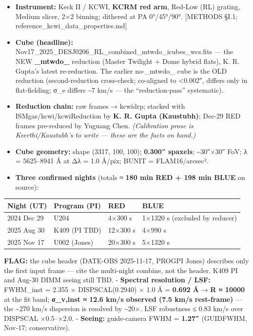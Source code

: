 \documentclass[
]{article}
\providecommand{\tightlist}{%
  \setlength{\itemsep}{0pt}\setlength{\parskip}{0pt}}
\newcommand{\BreakablePath}[1]{{\ttfamily\sloppy #1}}
\begin{document}
\begin{itemize}
\tightlist
\item
  \textbf{Instrument:} Keck II / KCWI, \textbf{KCRM red arm}, Red-Low
  (RL) grating, Medium slicer, 2×2 binning; dithered at PA 0°/45°/90°.
  {[}METHODS §I.1; reference\_kcwi\_data\_properties.md{]}
\item
  \textbf{Cube (headline):}
  \BreakablePath{Nov17\_\discretionary{}{}{}2025\_\discretionary{}{}{}DESJ0206\_\discretionary{}{}{}RL\_\discretionary{}{}{}combined\_\discretionary{}{}{}mtwdo\_\discretionary{}{}{}icubes\_\discretionary{}{}{}wcs.\discretionary{}{}{}fits}
  --- the NEW
  \textbf{\BreakablePath{\_\discretionary{}{}{}mtwdo\_\discretionary{}{}{}}}
  reduction (Master Twilight + Dome hybrid flats), K. R. Gupta's latest
  re-reduction. The earlier
  no-\BreakablePath{\_\discretionary{}{}{}mtwdo\_\discretionary{}{}{}}
  cube is the OLD reduction (second-reduction cross-check; co-aligned to
  \textless0.002″, differs only in flat-fielding; σ\_e differs
  \textasciitilde7 km/s --- the ``reduction-pass'' systematic).
\item
  \textbf{Reduction chain:} raw frames → \BreakablePath{kcwidrp};
  stacked with
  \BreakablePath{ISMgas/\discretionary{}{}{}kcwi/\discretionary{}{}{}kcwiReduction}
  by \textbf{K. R. Gupta (Kaustubh)}; Dec-29 RED frames pre-reduced by
  Yuguang Chen. \emph{(Calibration prose is Keerthi/Kaustubh's to write
  --- these are the facts on hand.)}
\item
  \textbf{Cube geometry:} shape (3317, 100, 100); \textbf{0.300″
  spaxels}; \textasciitilde30″×30″ FoV; λ = 5625--8941 Å at Δλ = 1.0
  Å/pix; BUNIT = FLAM16/arcsec².
\item
  \textbf{Three confirmed nights} (totals ≈ \textbf{180 min RED + 198
  min BLUE} on source):
\end{itemize}

\begin{longtable}[]{@{}llll@{}}
\toprule
Night (UT) & Program (PI) & RED & BLUE \\
\midrule
\endhead
2024 Dec 29 & U204 & 4×300 s & 1×1320 s (excluded by reducer) \\
2025 Aug 30 & K409 (PI TBD) & 12×300 s & 4×990 s \\
2025 Nov 17 & U002 (Jones) & 20×300 s & 5×1320 s \\
\bottomrule
\end{longtable}

\textbf{FLAG:} the cube header (DATE-OBS 2025-11-17, PROGPI Jones)
describes only the first input frame --- cite the multi-night combine,
not the header. K409 PI and Aug-30 DIMM seeing still TBD. -
\textbf{Spectral resolution / LSF:} FWHM\_inst = 2.355 ×
DISPSCAL(0.2940) × 1.0 Å = \textbf{0.692 Å} → \textbf{R ≈ 10000} at the
fit band; \textbf{σ\_v,inst ≈ 12.6 km/s observed (7.5 km/s rest-frame)}
--- the \textasciitilde270 km/s dispersion is resolved by
\textasciitilde20×. LSF robustness ≤ 0.83 km/s over DISPSCAL ×0.5--×2.0.
- \textbf{Seeing:} guide-camera FWHM = \textbf{1.27″}
(\BreakablePath{GUIDFWHM}, Nov-17; conservative).
\end{document}
